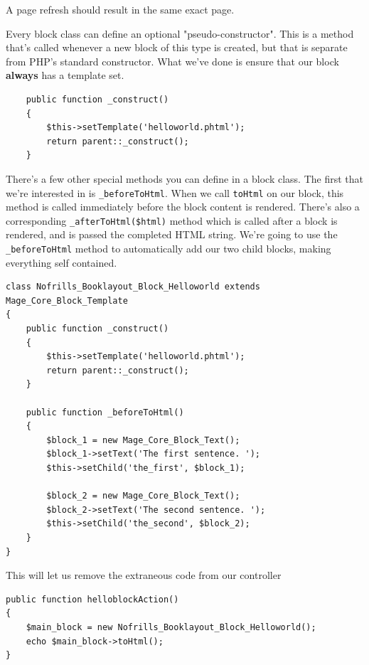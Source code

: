 \documentclass[oneside]{book}
\begin{document}
A page refresh should result in the same exact page.

Every block class can define an optional "pseudo-constructor".  This is a method that's called whenever a new block of this type is created, but that is separate from PHP's standard constructor.  What we've done is ensure that our block \textbf{always} has a template set.

\begin{lstlisting}
    public function _construct()
    {
        $this->setTemplate('helloworld.phtml');
        return parent::_construct();
    }

\end{lstlisting}


There's a few  other special methods you can define in a block class.  The first that we're interested in is \footnotesize\texttt{\_beforeToHtml}\normalsize.  When we call \footnotesize\texttt{toHtml} \normalsize  on our block, this method is called immediately before the block content is rendered.  There's also a corresponding \footnotesize\texttt{\_afterToHtml(\$html)} \normalsize  method which is called after a block is rendered, and is passed the completed HTML string.  We're going to use the \footnotesize\texttt{\_beforeToHtml} \normalsize  method to automatically add our two child blocks, making everything self contained.

\begin{lstlisting}
class Nofrills_Booklayout_Block_Helloworld extends Mage_Core_Block_Template
{
    public function _construct()
    {
        $this->setTemplate('helloworld.phtml');
        return parent::_construct();
    }

    public function _beforeToHtml()
    {
        $block_1 = new Mage_Core_Block_Text();
        $block_1->setText('The first sentence. ');
        $this->setChild('the_first', $block_1);

        $block_2 = new Mage_Core_Block_Text();
        $block_2->setText('The second sentence. ');
        $this->setChild('the_second', $block_2);
    }
}

\end{lstlisting}


This will let us remove the extraneous code from our controller

\begin{lstlisting}
public function helloblockAction()
{
    $main_block = new Nofrills_Booklayout_Block_Helloworld();
    echo $main_block->toHtml();
}

\end{lstlisting}
\end{document}
